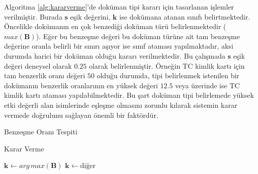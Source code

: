 \documentclass[conference, a4paper]{IEEEtran}
\begin{document}
Algoritma \ref{alg:kararverme}'de doküman tipi kararı için tasarlanan işlemler verilmiştir. Burada  $\mathbf{s}$ eşik
değerini, $\mathbf{k}$ ise dokümana atanan sınıfı belirtmektedir. Öncelikle dokümanın en çok benzediği doküman türü
belirlenmektedir ($max(\mathbf{B})$). Eğer bu benzeşme değeri bu doküman türüne ait tam benzeşme değerine oranla
belirli bir sınırı aşıyor ise sınıf ataması yapılmaktadır, aksi durumda harici bir doküman olduğu kararı verilmektedir.
Bu çalışmada $\mathbf{s}$ eşik değeri deneysel olarak $0.25$ olarak belirlenmiştir. Örneğin TC kimlik kartı için tam
benzerlik oranı değeri $50$ olduğu durumda, tipi belirlenmek istenilen bir dokümanın benzerlik oranlarının en yüksek
değeri $12.5$ veya üzerinde ise TC kimlik kartı ataması yapılabilmektedir. Bu şart doküman tipi belirlemede yüksek etki
değerli alan isimlerinde eşleşme olmasını zorunlu kılarak sistemin karar vermede doğrulunu sağlayan önemli bir
faktördür.

\begin{algorithm}
    \caption{Benzeşme Oranı Tespiti}
    \label{alg:benzesmeorani}
    \SetAlgoLined

\end{algorithm}



\begin{algorithm}
    \caption{Karar Verme}
    \label{alg:kararverme}
    \SetAlgoLined
    {$\mathbf{k} \leftarrow {arg\,max}(\textbf{B})$}
    {$\mathbf{k} \leftarrow \text{diğer}$}

\end{algorithm}
\end{document}
